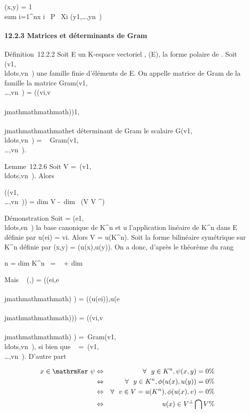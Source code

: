 \phi(x,y) = 1  \\sum
i=1^nx i \partial~P \over
\partial~Xi
(y1,\ldots,yn~)

\paragraph{12.2.3 Matrices et déterminants de Gram}

Définition~12.2.2 Soit E un K-espace vectoriel , \Phi \inQ(E), \phi la forme
polaire de \Phi. Soit
(v1,\\ldots,vn~)
une famille finie d'éléments de E. On appelle matrice de Gram de la
famille la matrice
Gram(v1,\\\ldots,vn~)
= (\phi(vi,v\\\\jmathmathmathmath))1\leqi,\\\\jmathmathmathmath\leqn et déterminant de Gram
le scalaire
G(v1,\\ldots,vn~)
= ~
Gram(v1,\\\ldots,vn~).

Lemme~12.2.6 Soit V =\
\mathrmVect(v1,\\ldots,vn~).
Alors

\mathrmrg(\Gram(v1,\\\ldots,vn~))
= dim V -\ dim~ (V \bigcap
V ^\bot)

Démonstration Soit  =
(e1,\\ldots,en~)
la base canonique de K^n et u l'application linéaire de
K^n dans E définie par u(ei) = vi. Alors
V = u(K^n). Soit \psi la forme bilinéaire symétrique sur
K^n définie par \psi(x,y) = \phi(u(x),u(y)). On a donc, d'après le
théorème du rang

n = dim K^n~
= \mathrmrg~\psi
+ dim~
\mathrmKer~\psi

Mais \mathrmMat~ (\psi,) =
\left (\psi(ei,e\\\\jmathmathmathmath)\right
) = \left
(\phi(u(ei)),u(e\\\\jmathmathmathmath))\right ) =
\left (\phi(vi,v\\\\jmathmathmathmath)\right
) =\
Gram(v1,\\ldots,vn~),
si bien que \mathrmrg~\psi
=\
\mathrmrgGram(v1,\\\ldots,vn~).
D'autre part

\begin{align*} x
\in\mathrmKer~\psi&
\Leftrightarrow & \forall~~y \in
K^n, \psi(x,y) = 0 \%& \\ &
\Leftrightarrow & \forall~~y \in
K^n,\phi(u(x),u(y)) = 0 \%& \\ &
\Leftrightarrow & \forall~~v \in V =
u(K^n), \phi(u(x),v) = 0\%& \\ &
\Leftrightarrow & u(x) \in V ^\bot\bigcap V \%&
\\ \end{align*}

